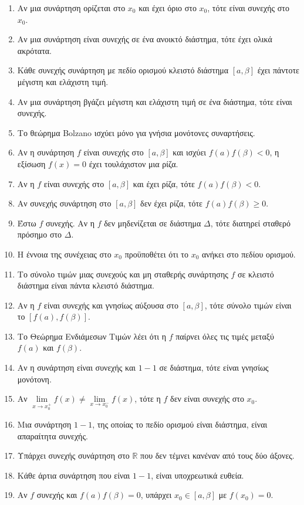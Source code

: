 \documentclass[11pt,a4paper]{article}
\newcommand{\eng}[1]{\selectlanguage{english}#1\selectlanguage{greek}}
\begin{document}
\begin{enumerate}[label=\textbf{1.\arabic*.}]
    \item Αν μια συνάρτηση ορίζεται στο $x_0$ και έχει όριο στο $x_0$, τότε είναι συνεχής στο $x_0$.
    \item Αν μια συνάρτηση είναι συνεχής σε ένα ανοικτό διάστημα, τότε έχει ολικά ακρότατα.
    \item Κάθε συνεχής συνάρτηση με πεδίο ορισμού κλειστό διάστημα $[a, \beta]$ έχει πάντοτε μέγιστη και ελάχιστη τιμή.
    \item Αν μια συνάρτηση βγάζει μέγιστη και ελάχιστη τιμή σε ένα διάστημα, τότε είναι συνεχής.
    \item Το θεώρημα \eng{Bolzano} ισχύει μόνο για γνήσια μονότονες συναρτήσεις.
    \item Αν η συνάρτηση $f$ είναι συνεχής στο $[a, \beta]$ και ισχύει $f(a)f(\beta)<0$, η εξίσωση $f(x)=0$ έχει τουλάχιστον μια ρίζα.
    \item Αν η $f$ είναι συνεχής στο $[a, \beta]$ και έχει ρίζα, τότε $f(a)f(\beta) < 0$.
    \item Αν συνεχής συνάρτηση στο $[a, \beta]$ δεν έχει ρίζα, τότε $f(a)f(\beta) \ge 0$.
    \item Έστω $f$ συνεχής. Αν η $f$ δεν μηδενίζεται σε διάστημα $\Delta$, τότε διατηρεί σταθερό πρόσημο στο $\Delta$.
    \item Η έννοια της συνέχειας στο $x_0$ προϋποθέτει ότι το $x_0$ ανήκει στο πεδίου ορισμού.
    \item Το σύνολο τιμών μιας συνεχούς και μη σταθερής συνάρτησης $f$ σε κλειστό διάστημα είναι πάντα κλειστό διάστημα.
    \item Αν η $f$ είναι συνεχής και γνησίως αύξουσα στο $[a, \beta]$, τότε σύνολο τιμών είναι το $[f(a), f(\beta)]$.
    \item Το Θεώρημα Ενδιάμεσων Τιμών λέει ότι η $f$ παίρνει όλες τις τιμές μεταξύ $f(a)$ και $f(\beta)$.
    \item Αν η συνάρτηση είναι συνεχής και $1-1$ σε διάστημα, τότε είναι γνησίως μονότονη.
    \item Αν $\lim\limits_{x\to x_0^+} f(x) \ne \lim\limits_{x\to x_0^-} f(x)$, τότε η $f$ δεν είναι συνεχής στο $x_0$.
    \item Μια συνάρτηση $1-1$, της οποίας το πεδίο ορισμού είναι διάστημα, είναι απαραίτητα συνεχής.
    \item Υπάρχει συνεχής συνάρτηση στο $\mathbb{R}$ που δεν τέμνει κανέναν από τους δύο άξονες.
    \item Kάθε άρτια συνάρτηση που είναι $1-1$, είναι υποχρεωτικά ευθεία.
    \item Αν $f$ συνεχής και $f(a)f(\beta)=0$, υπάρχει $x_0 \in [a, \beta]$ με $f(x_0)=0$.

\end{enumerate}
\end{document}
